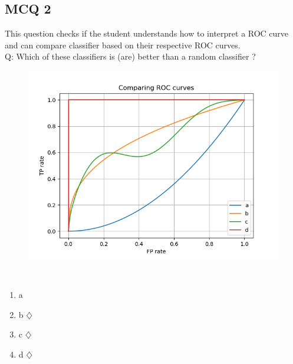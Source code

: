 \documentclass[a4paper, 10pt]{article}
\begin{document}
\subsection{MCQ 2}
This question checks if the student understands how to interpret a ROC curve and can compare
classifier based on their respective ROC curves.
\\
Q: Which of these classifiers is (are) better than a random classifier ? 
\\
\begin{figure}
\centering
	\includegraphics[scale=0.7]{ex4}
\end{figure}
\\
\begin{enumerate}
    \item a
    \item b $\diamondsuit$
    \item c $\diamondsuit$
    \item d $\diamondsuit$
\end{enumerate}
\end{document}
